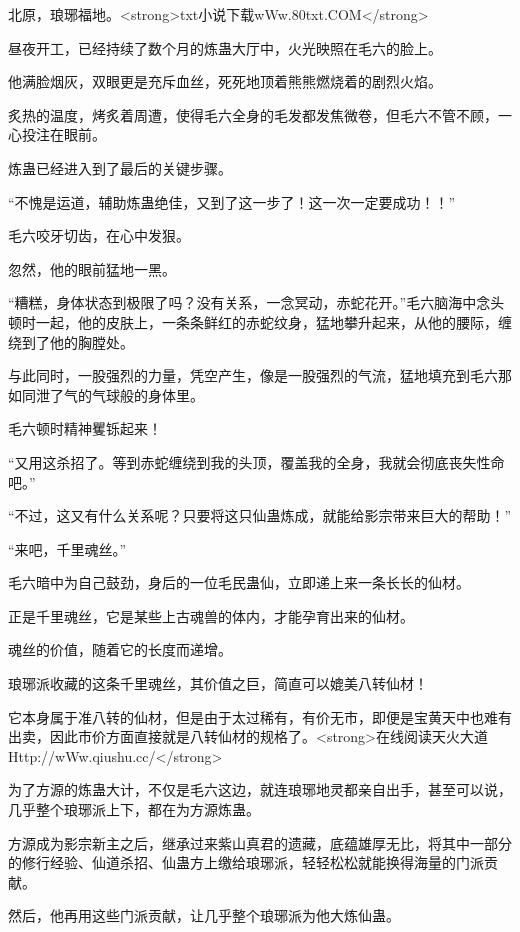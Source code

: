 
\begin{this_body}

北原，琅琊福地。<strong>txt小说下载wWw.80txt.COM</strong>

昼夜开工，已经持续了数个月的炼蛊大厅中，火光映照在毛六的脸上。

他满脸烟灰，双眼更是充斥血丝，死死地顶着熊熊燃烧着的剧烈火焰。

炙热的温度，烤炙着周遭，使得毛六全身的毛发都发焦微卷，但毛六不管不顾，一心投注在眼前。

炼蛊已经进入到了最后的关键步骤。

“不愧是运道，辅助炼蛊绝佳，又到了这一步了！这一次一定要成功！！”

毛六咬牙切齿，在心中发狠。

忽然，他的眼前猛地一黑。

“糟糕，身体状态到极限了吗？没有关系，一念冥动，赤蛇花开。”毛六脑海中念头顿时一起，他的皮肤上，一条条鲜红的赤蛇纹身，猛地攀升起来，从他的腰际，缠绕到了他的胸膛处。

与此同时，一股强烈的力量，凭空产生，像是一股强烈的气流，猛地填充到毛六那如同泄了气的气球般的身体里。

毛六顿时精神矍铄起来！

“又用这杀招了。等到赤蛇缠绕到我的头顶，覆盖我的全身，我就会彻底丧失性命吧。”

“不过，这又有什么关系呢？只要将这只仙蛊炼成，就能给影宗带来巨大的帮助！”

“来吧，千里魂丝。”

毛六暗中为自己鼓劲，身后的一位毛民蛊仙，立即递上来一条长长的仙材。

正是千里魂丝，它是某些上古魂兽的体内，才能孕育出来的仙材。

魂丝的价值，随着它的长度而递增。

琅琊派收藏的这条千里魂丝，其价值之巨，简直可以媲美八转仙材！

它本身属于准八转的仙材，但是由于太过稀有，有价无市，即便是宝黄天中也难有出卖，因此市价方面直接就是八转仙材的规格了。<strong>在线阅读天火大道Http://wWw.qiushu.cc/</strong>

为了方源的炼蛊大计，不仅是毛六这边，就连琅琊地灵都亲自出手，甚至可以说，几乎整个琅琊派上下，都在为方源炼蛊。

方源成为影宗新主之后，继承过来紫山真君的遗藏，底蕴雄厚无比，将其中一部分的修行经验、仙道杀招、仙蛊方上缴给琅琊派，轻轻松松就能换得海量的门派贡献。

然后，他再用这些门派贡献，让几乎整个琅琊派为他大炼仙蛊。


\end{this_body}
